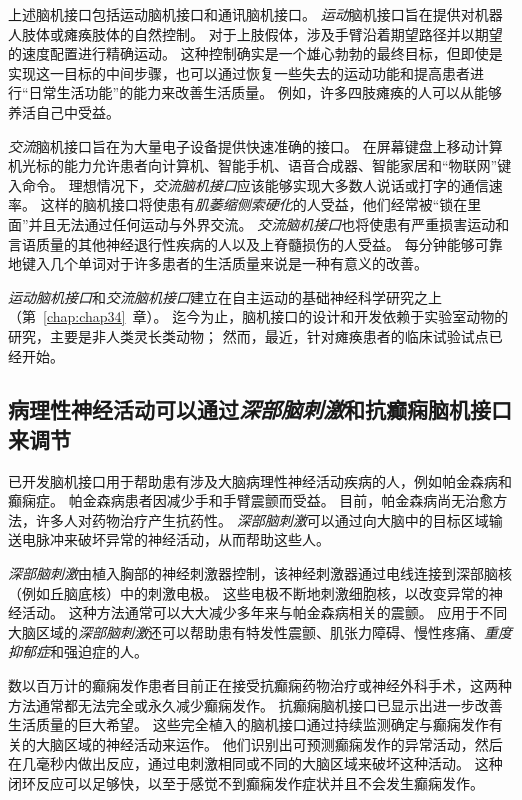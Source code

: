 上述脑机接口包括运动脑机接口和通讯脑机接口。
\textit{运动}脑机接口旨在提供对机器人肢体或瘫痪肢体的自然控制。
对于上肢假体，涉及手臂沿着期望路径并以期望的速度配置进行精确运动。
这种控制确实是一个雄心勃勃的最终目标，但即使是实现这一目标的中间步骤，也可以通过恢复一些失去的运动功能和提高患者进行“日常生活功能”的能力来改善生活质量。
例如，许多四肢瘫痪的人可以从能够养活自己中受益。


\textit{交流}脑机接口旨在为大量电子设备提供快速准确的接口。
在屏幕键盘上移动计算机光标的能力允许患者向计算机、智能手机、语音合成器、智能家居和“物联网”键入命令。 
理想情况下，\textit{交流脑机接口}应该能够实现大多数人说话或打字的通信速率。
这样的脑机接口将使患有\textit{肌萎缩侧索硬化}的人受益，他们经常被“锁在里面”并且无法通过任何运动与外界交流。
\textit{交流脑机接口}也将使患有严重损害运动和言语质量的其他神经退行性疾病的人以及上脊髓损伤的人受益。
每分钟能够可靠地键入几个单词对于许多患者的生活质量来说是一种有意义的改善。


\textit{运动脑机接口}和\textit{交流脑机接口}建立在自主运动的基础神经科学研究之上（第~\ref{chap:chap34}~章）。 
迄今为止，脑机接口的设计和开发依赖于实验室动物的研究，主要是非人类灵长类动物；
然而，最近，针对瘫痪患者的临床试验试点已经开始。



\subsection{病理性神经活动可以通过\textit{深部脑刺激}和抗癫痫脑机接口来调节}

已开发脑机接口用于帮助患有涉及大脑病理性神经活动疾病的人，例如帕金森病和癫痫症。
帕金森病患者因减少手和手臂震颤而受益。
目前，帕金森病尚无治愈方法，许多人对药物治疗产生抗药性。
\textit{深部脑刺激}可以通过向大脑中的目标区域输送电脉冲来破坏异常的神经活动，从而帮助这些人。


\textit{深部脑刺激}由植入胸部的神经刺激器控制，该神经刺激器通过电线连接到深部脑核（例如丘脑底核）中的刺激电极。
这些电极不断地刺激细胞核，以改变异常的神经活动。 
这种方法通常可以大大减少多年来与帕金森病相关的震颤。
应用于不同大脑区域的\textit{深部脑刺激}还可以帮助患有特发性震颤、肌张力障碍、慢性疼痛、\textit{重度抑郁症}和强迫症的人。


数以百万计的癫痫发作患者目前正在接受抗癫痫药物治疗或神经外科手术，这两种方法通常都无法完全或永久减少癫痫发作。
抗癫痫脑机接口已显示出进一步改善生活质量的巨大希望。
这些完全植入的脑机接口通过持续监测确定与癫痫发作有关的大脑区域的神经活动来运作。 
他们识别出可预测癫痫发作的异常活动，然后在几毫秒内做出反应，通过电刺激相同或不同的大脑区域来破坏这种活动。 
这种闭环反应可以足够快，以至于感觉不到癫痫发作症状并且不会发生癫痫发作。



